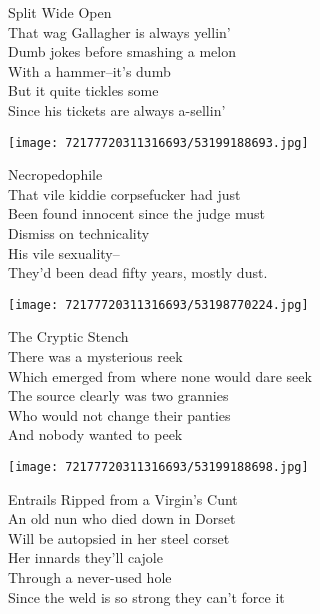 \documentclass[10pt,letterpaper]{article}
\begin{document}
\begin{center}
Split Wide Open\\
\vskip 0.2in
That wag Gallagher is always yellin'\\
Dumb jokes before smashing a melon\\
With a hammer--it's dumb\\
But it quite tickles some\\
Since his tickets are always a-sellin'\\
\end{center}
\pagebreak

\begin{center}\texttt{[image: 72177720311316693/53199188693.jpg]}
\end{center}
\begin{center}
Necropedophile\\
\vskip 0.2in
That vile kiddie corpsefucker had just\\
Been found innocent since the judge must\\
Dismiss on technicality\\
His vile sexuality--\\
They'd been dead fifty years, mostly dust.\\
\end{center}
\pagebreak

\begin{center}\texttt{[image: 72177720311316693/53198770224.jpg]}
\end{center}
\begin{center}
The Cryptic Stench\\
\vskip 0.2in
There was a mysterious reek\\
Which emerged from where none would dare seek\\
The source clearly was two grannies\\
Who would not change their panties\\
And nobody wanted to peek\\
\end{center}
\pagebreak

\begin{center}
\texttt{[image: 72177720311316693/53199188698.jpg]}
\end{center}

\begin{center}
Entrails Ripped from a Virgin's Cunt\\
\vskip 0.2in
An old nun who died down in Dorset\\
Will be autopsied in her steel corset\\
Her innards they'll cajole\\
Through a never-used hole\\
Since the weld is so strong they can't force it\\
\end{center}
\pagebreak
\end{document}

